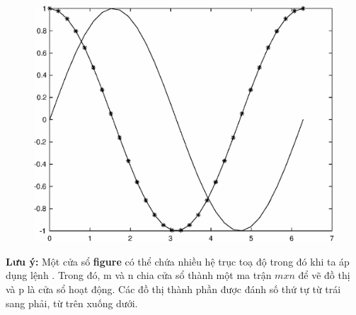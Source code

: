\documentclass[12pt,a4paper]{article}
\begin{document}
\begin{center}
	\begin{figure}[H]
	\begin{center}
		\includegraphics[scale=0.6]{hinhtieuluan/dothi13}
	\end{center}
		\caption{}
		\label{refdothi13}
	\end{figure}
\end{center}
\textbf{Lưu ý:} Một cửa sổ \textbf{figure} có thể chứa nhiều hệ trục toạ độ trong đó khi ta áp dụng lệnh . Trong đó, m và n chia cửa sổ thành một ma trận $mxn$ để vẽ đồ thị và p là cửa sổ hoạt động. Các đồ thị thành phần được đánh số thứ tự từ trái sang phải, từ trên xuống dưới.
\end{document}
